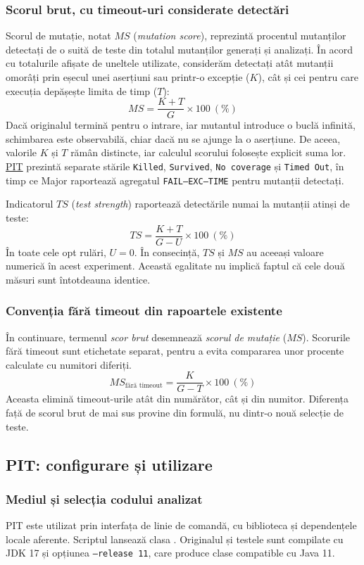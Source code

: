 \documentclass[11pt,a4paper]{article}
\begin{document}
\subsubsection{Scorul brut, cu timeout-uri considerate detectări}
Scorul de mutație, notat $MS$ (\emph{mutation score}), reprezintă procentul mutanților detectați de o suită de teste din totalul mutanților generați și analizați. În acord cu totalurile afișate de uneltele utilizate, considerăm detectați atât mutanții omorâți prin eșecul unei aserțiuni sau printr-o excepție ($K$), cât și cei pentru care execuția depășește limita de timp ($T$):
\[
MS=\frac{K+T}{G}\times100\ (\%)
\]
Dacă originalul termină pentru o intrare, iar mutantul introduce o buclă
infinită, schimbarea este observabilă, chiar dacă nu se ajunge la o aserțiune.
De aceea, valorile $K$ și $T$ rămân distincte, iar calculul
scorului folosește explicit suma lor. \href{https://pitest.org/quickstart/basic_concepts/}{PIT}
prezintă separate stările \texttt{Killed}, \texttt{Survived},
\texttt{No coverage} și \texttt{Timed Out}, în timp ce Major raportează
agregatul \texttt{FAIL--EXC--TIME} pentru mutanții detectați.

Indicatorul $TS$ (\emph{test strength}) raportează detectările numai la mutanții
atinși de teste:
\[
TS=\frac{K+T}{G-U}\times100\ (\%)
\]
În toate cele opt rulări, $U=0$. În consecință, $TS$ și $MS$ au aceeași
valoare numerică în acest experiment. Această egalitate nu implică faptul
că cele două măsuri sunt întotdeauna identice.

\subsubsection{Convenția fără timeout din rapoartele existente}
În continuare, termenul \emph{scor brut} desemnează \emph{scorul de mutație} ($MS$).
Scorurile fără timeout sunt etichetate separat, pentru a evita compararea
unor procente calculate cu numitori diferiți.
\[
MS_{\text{fără timeout}}=\frac{K}{G-T}\times100\ (\%)
\]
Aceasta elimină timeout-urile atât din numărător, cât și din numitor.
Diferența față de scorul brut de mai sus provine din formulă, nu dintr-o
nouă selecție de teste.



\subsection{PIT: configurare și utilizare}
\subsubsection{Mediul și selecția codului analizat}
PIT este utilizat prin interfața de linie de comandă, cu biblioteca
 și dependențele locale aferente.
Scriptul  lansează clasa
.
Originalul și testele sunt compilate cu JDK 17 și opțiunea \texttt{--release 11},
care produce clase compatible cu Java 11. 
\end{document}
